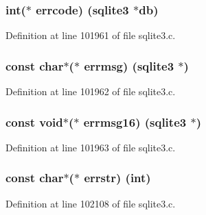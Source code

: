 \subsubsection[{errcode}]{\setlength{\rightskip}{0pt plus 5cm}int($\ast$ errcode) ({\bf sqlite3} $\ast$db)}\label{structsqlite3__api__routines_a9cf1e23a3f17f5fdafb327194466cc80}


Definition at line 101961 of file sqlite3.\+c.

\hypertarget{structsqlite3__api__routines_aa8406d8ac4fb37fa9772c0ea1293c4c0}{}
\subsubsection[{errmsg}]{\setlength{\rightskip}{0pt plus 5cm}const char$\ast$($\ast$ errmsg) ({\bf sqlite3} $\ast$)}\label{structsqlite3__api__routines_aa8406d8ac4fb37fa9772c0ea1293c4c0}


Definition at line 101962 of file sqlite3.\+c.

\hypertarget{structsqlite3__api__routines_a819557ae1f065e16705e927ed1c8544b}{}
\subsubsection[{errmsg16}]{\setlength{\rightskip}{0pt plus 5cm}const void$\ast$($\ast$ errmsg16) ({\bf sqlite3} $\ast$)}\label{structsqlite3__api__routines_a819557ae1f065e16705e927ed1c8544b}


Definition at line 101963 of file sqlite3.\+c.

\hypertarget{structsqlite3__api__routines_a16a09ec4c2c5af6736eb73e8d0110f99}{}
\subsubsection[{errstr}]{\setlength{\rightskip}{0pt plus 5cm}const char$\ast$($\ast$ errstr) (int)}\label{structsqlite3__api__routines_a16a09ec4c2c5af6736eb73e8d0110f99}


Definition at line 102108 of file sqlite3.\+c.

